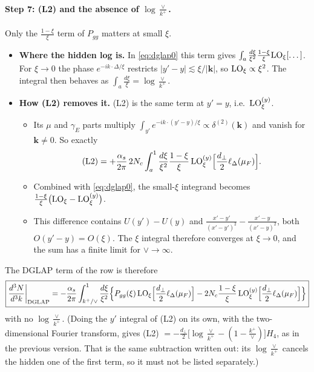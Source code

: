 \documentclass[10pt]{article}
\numberwithin{equation}{section}
\newcommand{\LO}{{\rm LO}}
\begin{document}
\paragraph{Step 7: (L2) and the absence of $\log\frac{\vee}{k^+}$.} Only the $\frac{1-\xi}{\xi}$ term of $P_{gg}$ matters at small $\xi$.
\begin{itemize}
\item \textbf{Where the hidden log is.} In \eqref{eq:dglap0} this term gives $\int_a\frac{d\xi}{\xi^2}\frac{1-\xi}{\xi}\LO_\xi[\dots]$. For $\xi\to0$ the phase $e^{-ik\cdot\Delta/\xi}$ restricts $|y'-y|\lesssim\xi/|\mathbf k|$, so $\LO_\xi\propto\xi^2$. The integral then behaves as $\int_a\frac{d\xi}{\xi}=\log\frac{\vee}{k^+}$.
\item \textbf{How (L2) removes it.} (L2) is the same term at $y'=y$, i.e.\ $\LO^{(y)}_\xi$.
\begin{itemize}
\item Its $\mu$ and $\gamma_E$ parts multiply $\int_{y'}e^{-ik\cdot(y'-y)/\xi}\propto\delta^{(2)}(\mathbf k)$ and vanish for $\mathbf k\neq0$. So exactly
\begin{equation}
({\rm L2})=+\frac{\alpha_s}{2\pi}\,2N_c\int_a^1\frac{d\xi}{\xi^2}\frac{1-\xi}{\xi}\,\LO^{(y)}_\xi\Big[\frac{d_\perp}{2}\ell_\Delta(\mu_F)\Big].
\end{equation}
\item Combined with \eqref{eq:dglap0}, the small-$\xi$ integrand becomes $\frac{1-\xi}{\xi}\big(\LO_\xi-\LO^{(y)}_\xi\big)$.
\item This difference contains $U(y')-U(y)$ and $\frac{x'-y'}{(x'-y')^2}-\frac{x'-y}{(x'-y)^2}$, both $O(y'-y)=O(\xi)$. The $\xi$ integral therefore converges at $\xi\to0$, and the sum has a finite limit for $\vee\to\infty$.
\end{itemize}
\end{itemize}
The DGLAP term of the row is therefore
\begin{equation}
\boxed{\frac{d^3N}{d^3k}\bigg|_{\rm DGLAP}=-\frac{\alpha_s}{2\pi}\int_{k^+/\vee}^1\frac{d\xi}{\xi^2}\Big\{P_{gg}(\xi)\,\LO_\xi\Big[\frac{d_\perp}{2}\ell_\Delta(\mu_F)\Big]-2N_c\frac{1-\xi}{\xi}\,\LO^{(y)}_\xi\Big[\frac{d_\perp}{2}\ell_\Delta(\mu_F)\Big]\Big\}}\label{eq:dglap}
\end{equation}
with no $\log\frac{\vee}{k^+}$. (Doing the $y'$ integral of (L2) on its own, with the two-dimensional Fourier transform, gives (L2) $=-\frac{d_\perp}{2}\big[\log\frac{\vee}{k^+}-(1-\frac{k^+}{\vee})\big]H_4$, as in the previous version. That is the same subtraction written out: its $\log\frac{\vee}{k^+}$ cancels the hidden one of the first term, so it must not be listed separately.)
\end{document}
